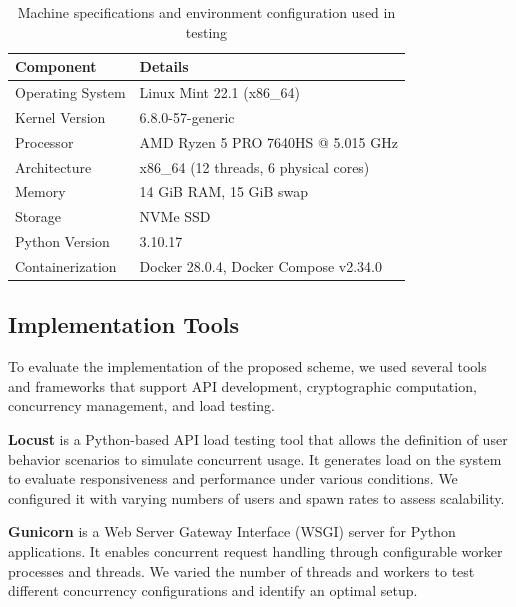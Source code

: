 \documentclass[cic,tc,english]{iiufrgs}
\begin{document}
            \begin{table}[h]
                \centering
                \begin{tabular}{|l|l|}
                \hline
                \textbf{Component} & \textbf{Details} \\ \hline
                Operating System & Linux Mint 22.1 (x86\_64) \\ \hline
                Kernel Version & 6.8.0-57-generic \\ \hline
                Processor & AMD Ryzen 5 PRO 7640HS @ 5.015 GHz \\ \hline
                Architecture & x86\_64 (12 threads, 6 physical cores) \\ \hline
                Memory & 14 GiB RAM, 15 GiB swap \\ \hline
                Storage & NVMe SSD \\ \hline
                Python Version & 3.10.17 \\ \hline
                Containerization & Docker 28.0.4, Docker Compose v2.34.0 \\ \hline
                \end{tabular}
                \caption{Machine specifications and environment configuration used in testing}
                \label{tab:machine_specs}
            \end{table}
                

            
            \subsection{Implementation Tools}
            \label{subsec:tools}

                To evaluate the implementation of the proposed scheme, we used several tools and frameworks that support API development, cryptographic computation, concurrency management, and load testing.

                \textbf{Locust} is a Python-based API load testing tool that allows the definition of user behavior scenarios to simulate concurrent usage. It generates load on the system to evaluate responsiveness and performance under various conditions. We configured it with varying numbers of users and spawn rates to assess scalability.

                \textbf{Gunicorn} is a Web Server Gateway Interface (WSGI) server for Python applications. It enables concurrent request handling through configurable worker processes and threads. We varied the number of threads and workers to test different concurrency configurations and identify an optimal setup.
\end{document}
